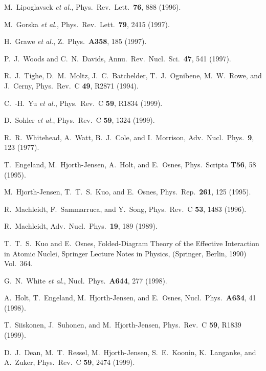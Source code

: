 \begin{references}

 M.\ Lipoglavsek {\em et al.}, Phys.\ Rev.\ Lett.\ {\bf 76}, 888 (1996).

 M.\ Gorska {\em et al.}, Phys.\ Rev.\ Lett.\ {\bf 79}, 2415 (1997).

 H.\ Grawe {\em et al.}, Z.\ Phys.\ {\bf A358}, 185 (1997).

 P.~J.~Woods and C.~N.~Davids, 
                         Annu.~Rev.~Nucl.~Sci.~{\bf 47}, 541 (1997).

 R.~J.~Tighe, D.~M.~Moltz, J.~C.~Batchelder, T.~J.~Ognibene,
                M.~W.~Rowe, and J.~Cerny, Phys.~Rev.~C {\bf 49}, R2871 (1994).

 C.~-H.~Yu {\em et al.}, Phys.~Rev.~C {\bf 59}, R1834 (1999).

 D.~Sohler {\em et al.}, Phys.~Rev.~C {\bf 59}, 1324 (1999).


 R.~R.~Whitehead, A.~Watt, B.~J.~Cole, and I.~Morrison, 
                 Adv.~Nucl.~Phys.~{\bf 9}, 123 (1977).

 T.~Engeland, M.~Hjorth-Jensen, A.~Holt, and E.~Osnes,
                 Phys.~Scripta {\bf T56}, 58 (1995).

  M.~Hjorth-Jensen, T.~T.~S.~Kuo, and E.~Osnes, 
                 Phys.~Rep.~{\bf 261}, 125  (1995).

 R.~Machleidt, F.~Sammarruca, and Y.~Song,
                 Phys.~Rev.~C {\bf 53}, 1483 (1996).

  R.~Machleidt, Adv.~Nucl.~Phys.~{\bf 19}, 189 (1989). 

  T.~T.~S.~Kuo and E.~Osnes, Folded-Diagram Theory of the
Effective Interaction in Atomic Nuclei, Springer Lecture Notes in Physics,
(Springer, Berlin, 1990) Vol.~364.

 G.~N.~White {\em et al.}, 
                 Nucl.\ Phys.\ {\bf A644}, 277 (1998).

 A.~Holt, T.~Engeland, M.~Hjorth-Jensen, and E.~Osnes,
                 Nucl.~Phys.~{\bf A634}, 41 (1998).

  T.~Siiskonen, J.~Suhonen, and M.~Hjorth-Jensen, 
                 Phys.~Rev.~C {\bf 59}, R1839 (1999).

D.~J.~Dean, M.~T.~Ressel, M.~Hjorth-Jensen, S.~E.~Koonin,
                 K.~Langanke, and A.~Zuker, Phys.~Rev.~C {\bf 59}, 2474 (1999).


\end{references}
